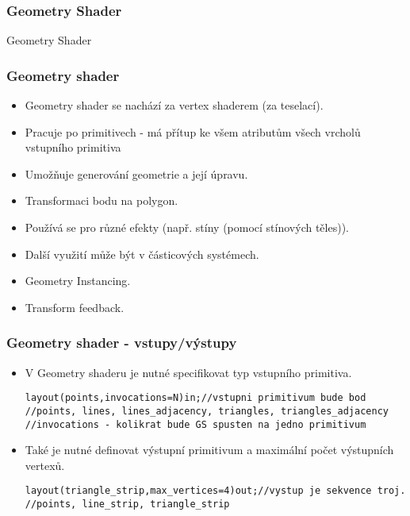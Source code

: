 \begin{frame}
\frametitle{Geometry Shader}
\begin{center}
\Huge {\color{white}Geometry Shader}
\end{center}
\end{frame}

\begin{frame}[fragile]
\frametitle{Geometry shader}
	\begin{itemize}
	\item Geometry shader se nachází za vertex shaderem (za teselací).
	\item Pracuje po primitivech - má přítup ke všem atributům všech vrcholů vstupního primitiva
	\item Umožňuje generování geometrie a její úpravu.
	\item Transformaci bodu na polygon. 
	\item Používá se pro různé efekty (např. stíny (pomocí stínových těles)).
	\item Další využití může být v částicových systémech.
	\item Geometry Instancing.
	\item Transform feedback.
	\end{itemize}
\end{frame}

\begin{frame}[fragile]
\frametitle{Geometry shader - vstupy/výstupy}
	\begin{itemize}
	\item V Geometry shaderu je nutné specifikovat typ vstupního primitiva.
	{\scriptsize
	\begin{verbatim}
layout(points,invocations=N)in;//vstupni primitivum bude bod
//points, lines, lines_adjacency, triangles, triangles_adjacency
//invocations - kolikrat bude GS spusten na jedno primitivum
	\end{verbatim}
	}
	\item Také je nutné definovat výstupní primitivum a maximální počet výstupních vertexů.
	{\scriptsize
	\begin{verbatim}
layout(triangle_strip,max_vertices=4)out;//vystup je sekvence troj.
//points, line_strip, triangle_strip
	\end{verbatim}
	}
	\end{itemize}
\end{frame}

